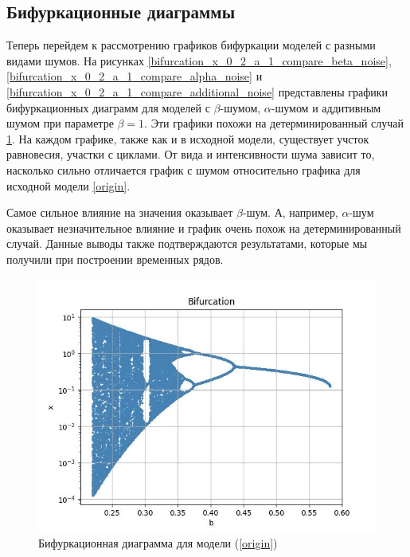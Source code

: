 \subsection{Бифуркационные диаграммы}

    Теперь перейдем к рассмотрению графиков бифуркации моделей с разными видами шумов. На рисунках \ref{bifurcation_x_0_2_a_1_compare_beta_noise}, \ref{bifurcation_x_0_2_a_1_compare_alpha_noise} и \ref{bifurcation_x_0_2_a_1_compare_additional_noise} представлены графики бифуркационных диаграмм для моделей с \(\beta\)-шумом, \(\alpha\)-шумом и аддитивным шумом при параметре \(\beta = 1\). Эти графики похожи на детерминированный случай \ref{bifurcation_x_0_2_a_1_compare_no_noise}. На каждом графике, также как и в исходной модели, существует учсток равновесия, участки с циклами. От вида и интенсивности шума зависит то, насколько сильно отличается график с шумом относительно графика для исходной модели \ref{origin}. 

    Самое сильное влияние на значения оказывает \(\beta\)-шум. А, например, \(\alpha\)-шум оказывает незначительное влияние и график очень похож на детерминированный случай. Данные выводы также подтверждаются результатами, которые мы получили при построении временных рядов.


    \begin{figure}
        \centering
        \includegraphics[width=\textwidth]{stochastic/images/bifurcation_x_0_2_a_1_compare_no_noise.jpg}
        
        \captionsetup{justification=centering}
        \caption{Бифуркационная диаграмма для модели (\ref{origin})}
        \label{bifurcation_x_0_2_a_1_compare_no_noise}
    \end{figure}


